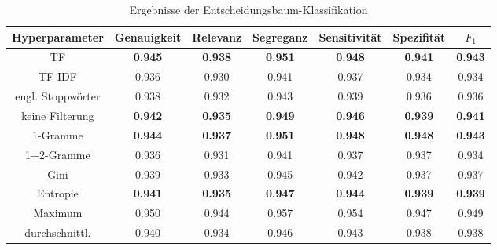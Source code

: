\begin{table}[htb]
	\begin{center}
		\begin{tabular}{|c|c|c|c|c|c|c|}
			\hline 
			Hyperparameter & Genauigkeit & Relevanz & Segreganz & Sensitivität & Spezifität & $F_1$ \\ \hline \hline
			TF       & \textbf{0.945} & \textbf{0.938} & \textbf{0.951} & \textbf{0.948} & \textbf{0.941} & \textbf{0.943} \\ \hline
			TF-IDF   & 0.936 & 0.930 & 0.941 & 0.937 & 0.934 & 0.934 \\ \hline \hline
			engl. Stoppwörter & 0.938 & 0.932 & 0.943 & 0.939 & 0.936 & 0.936 \\ \hline
			keine Filterung    & \textbf{0.942} & \textbf{0.935} & \textbf{0.949} & \textbf{0.946} & \textbf{0.939} & \textbf{0.941} \\ \hline \hline
			1-Gramme   & \textbf{0.944} & \textbf{0.937} & \textbf{0.951} & \textbf{0.948} & \textbf{0.948} & \textbf{0.943} \\ \hline
			1+2-Gramme  & 0.936 & 0.931 & 0.941 & 0.937 & 0.937 & 0.934 \\ \hline \hline
			Gini & 0.939 & 0.933 & 0.945 & 0.942 & 0.937 & 0.937 \\ \hline
			Entropie & \textbf{0.941} & \textbf{0.935} & \textbf{0.947} & \textbf{0.944} & \textbf{0.939} & \textbf{0.939} \\ \hline
			\hline
			Maximum        & 0.950 & 0.944 & 0.957 & 0.954 & 0.947 & 0.949 \\ \hline
			durchschnittl. & 0.940 & 0.934 & 0.946 & 0.943 & 0.938 & 0.938 \\ \hline
		\end{tabular}
		\caption{Ergebnisse der Entscheidungsbaum-Klassifikation}\label{results-tree}
	\end{center}
\end{table}\\

